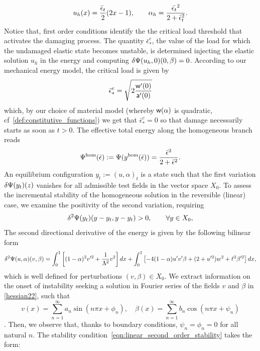 \documentclass[10pt]{article}
\begin{document}
%
\begin{equation}
u_h(x) =  \frac{\bar \epsilon_t}{2}(2x-1),\qquad\alpha_h = \frac{\Bar{\epsilon_t}^2}{2 + \Bar\epsilon_t^2}\label{eq:homo1}.
\end{equation}
Notice that,  
first order conditions identify the the critical load threshold that activates the damaging process. The quantity $\bar\epsilon_*^c$, the value of the load for which the undamaged elastic state becomes unstable, is determined injecting the elastic solution $u_h$ in the energy and computing $\delta \Psi(u_h, 0)(0, \beta)=0$.
According to our mechanical energy model, the critical load is given by
\begin{equation}
    {{{\bar{\epsilon}^c}_*}} = \sqrt{2\frac{\mathsf{w}'(0)}{\mathsf{a}'(0)}} 
\end{equation}
%
%
which, by our choice of material model (whereby $\mathsf{w}(\alpha)$ is quadratic, cf~\eqref{def:constitutive_functions}) we get that $\bar{\epsilon}^c_*=0$ so that damage necessarily starts as soon as $t>0$.
The effective {total} energy along the {homogeneous} branch reads  
\begin{equation}
    \label{eq:energy_homogeneous}
    \Psi^\text{hom}(\bar\epsilon) :=\Psi(y^{\text{hom}}(\bar\epsilon)) = \frac{\Bar{\epsilon}^2}{2 + \Bar\epsilon^2}.
\end{equation}
An equilibrium configuration $y_t:=(u,\alpha)_t$ is a state such that the first variation $\delta \Psi(y_t)(z)$ vanishes for all admissible test fields in the vector space $X_0$. 
To assess the incremental stability of the homogeneous solution in the reversible (linear) case, we examine the positivity of the second variation, requiring
\begin{equation}
\delta^2 \Psi(y_t)(y-y_t, y-y_t)>0, \qquad  \forall y\in X_0,
\label{eqn:linear_second_order_stability}
\end{equation} 
{The second directional derivative of the energy is given by the following bilinear form}
\begin{equation}
\delta^2 \Estiff(u,\alpha)(v,\beta)=\int_0^1 \left[(1-\alpha)^2v'^2 
+\frac{1}{\elastell^2} v^2 \right]dx
%
+\int_0^1
\left[ - 4(1-\alpha)u' v'\beta+(2+ u'^2)w^2+\damagell^2\beta'^2 \right] dx, 
\label{hessian22}
\end{equation}
%
which is well defined for perturbations $(v, \beta)\in X_0$.
{We} extract information on the onset of instability  seeking a solution in Fourier series of the fields $v$ and $\beta$ in \eqref{hessian22}, such that $$v(x)=\sum_{n=1}^{\infty} a_{n} \sin \left(n \pi x+\phi_{n}\right), \quad \beta(x)=\sum_{n=1}^{\infty} b_{n} \cos \left(n \pi x+\psi_{n}\right)$$. Then, we observe that, thanks to boundary conditions, $\psi_{n}=\phi_{n}=0$ for all natural $n$. The stability condition~\eqref{eqn:linear_second_order_stability}  takes the form:
\end{document}
